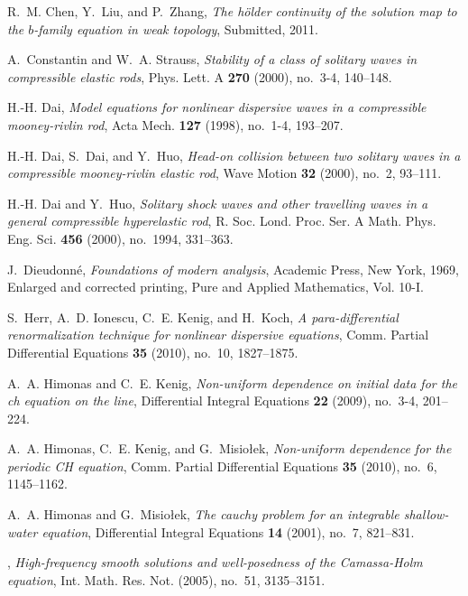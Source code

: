 \documentclass[12pt,oneside,reqno]{amsbook}
\numberwithin{equation}{section}
\numberwithin{section}{chapter}
\begin{document}
\begin{thebibliography}{100}
R.~M. Chen, Y.~Liu, and P.~Zhang, \emph{The h\"{o}lder continuity of the
  solution map to the $b$-family equation in weak topology}, Submitted, 2011.

A.~Constantin and W.~A. Strauss, \emph{Stability of a class of solitary waves
  in compressible elastic rods}, Phys. Lett. A \textbf{270} (2000), no.~3-4,
  140--148.

H.-H. Dai, \emph{Model equations for nonlinear dispersive waves in a
  compressible mooney-rivlin rod}, Acta Mech. \textbf{127} (1998), no.~1-4,
  193--207.

H.-H. Dai, S.~Dai, and Y.~Huo, \emph{Head-on collision between two solitary
  waves in a compressible mooney-rivlin elastic rod}, Wave Motion \textbf{32}
  (2000), no.~2, 93--111.

H.-H. Dai and Y.~Huo, \emph{Solitary shock waves and other travelling waves in
  a general compressible hyperelastic rod}, R. Soc. Lond. Proc. Ser. A Math.
  Phys. Eng. Sci. \textbf{456} (2000), no.~1994, 331--363.

J.~Dieudonn{{\'e}}, \emph{Foundations of modern analysis}, Academic Press, New
  York, 1969, Enlarged and corrected printing, Pure and Applied Mathematics,
  Vol. 10-I. 

S.~Herr, A.~D. Ionescu, C.~E. Kenig, and H.~Koch, \emph{A para-differential
  renormalization technique for nonlinear dispersive equations}, Comm. Partial
  Differential Equations \textbf{35} (2010), no.~10, 1827--1875.

A.~A. Himonas and C.~E. Kenig, \emph{Non-uniform dependence on initial data for
  the ch equation on the line}, Differential Integral Equations \textbf{22}
  (2009), no.~3-4, 201--224.

A.~A. Himonas, C.~E. Kenig, and G.~Misio{\l}ek, \emph{Non-uniform dependence
  for the periodic {CH} equation}, Comm. Partial Differential Equations
  \textbf{35} (2010), no.~6, 1145--1162. 

A.~A. Himonas and G.~Misio{\l}ek, \emph{The cauchy problem for an integrable
  shallow-water equation}, Differential Integral Equations \textbf{14} (2001),
  no.~7, 821--831.

\bysame, \emph{High-frequency smooth solutions and
  well-posedness of the {C}amassa-{H}olm equation}, Int. Math. Res. Not.
  (2005), no.~51, 3135--3151. 


\end{thebibliography}
\end{document}
